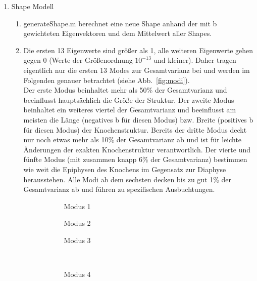 \documentclass[]{report}
\newlength\figureheight
\newlength\figurewidth
\begin{document}
\begin{enumerate}
	\item Shape Modell
	\begin{enumerate}
		\item
		generateShape.m berechnet eine neue Shape anhand der mit b gewichteten Eigenvektoren und dem Mittelwert aller Shapes.
		\item %
		Die ersten 13 Eigenwerte sind größer als 1, alle weiteren Eigenwerte gehen gegen 0 (Werte der Größenordnung $10^{-13}$ und kleiner). Daher tragen eigentlich nur die ersten 13 Modes zur Gesamtvarianz bei und werden im Folgenden genauer betrachtet (siehe Abb.~\ref{fig:modi}).\\
		Der erste Modus beinhaltet mehr als 50\% der Gesamtvarianz und beeinflusst hauptsächlich die Größe der Struktur.
		Der zweite Modus beinhaltet ein weiteres viertel der Gesamtvarianz und beeinflusst am meisten die Länge (negatives b für diesen Modus) bzw. Breite (positives b für diesen Modus) der Knochenstruktur.
		Bereits der dritte Modus deckt nur noch etwas mehr als 10\% der Gesamtvarianz ab und ist für leichte Änderungen der exakten Knochenstruktur verantwortlich.
		Der vierte und fünfte Modus (mit zusammen knapp 6\% der Gesamtvarianz) bestimmen wie weit die Epiphysen des Knochens im Gegensatz zur Diaphyse herausstehen.
		Alle Modi ab dem sechsten decken bis zu gut 1\% der Gesamtvarianz ab und führen zu spezifischen Ausbuchtungen.
		\setlength\figureheight{4cm}
		\setlength{}
		\begin{figure}[tbp!]
			\begin{subfigure}{0.3\textwidth}
				\centering
				
				\caption{Modus 1}
				\label{fig:mode1}
			\end{subfigure}
			\quad
			\begin{subfigure}{0.3\textwidth}
				\centering
				
				\caption{Modus 2}
				\label{fig:mode2}
			\end{subfigure}	
			\quad
			\begin{subfigure}{0.3\textwidth}
				\centering
				
				\caption{Modus 3}
				\label{fig:mode3}
			\end{subfigure}	
			\\
			\begin{subfigure}{0.3\textwidth}
				\centering
				
				\caption{Modus 4}
				\label{fig:mode4}
			\end{subfigure}
			\quad
			\begin{subfigure}{0.3\textwidth}

\end{subfigure}
\end{figure}
\end{enumerate}
\end{enumerate}
\end{document}
